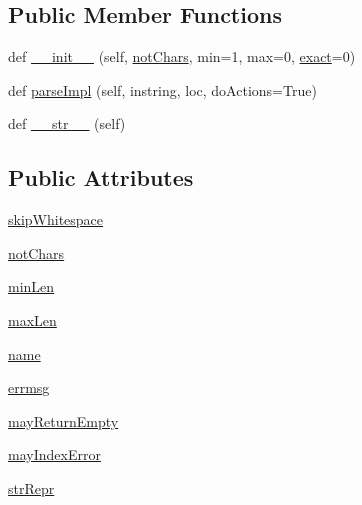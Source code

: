 \subsection*{Public Member Functions}
\begin{DoxyCompactItemize}
\item 
def \hyperlink{classsetuptools_1_1__vendor_1_1pyparsing_1_1CharsNotIn_a1aa8b49223feb8cc095a146acf54dfa8}{\+\_\+\+\_\+init\+\_\+\+\_\+} (self, \hyperlink{classsetuptools_1_1__vendor_1_1pyparsing_1_1CharsNotIn_aca873dd05f6e319faafa276d65469549}{not\+Chars}, min=1, max=0, \hyperlink{namespacesetuptools_1_1__vendor_1_1pyparsing_a4cac4dd1a3d815bb71fdb1334d94a010}{exact}=0)
\item 
def \hyperlink{classsetuptools_1_1__vendor_1_1pyparsing_1_1CharsNotIn_ab9d473644544bcc233f7a8646563d737}{parse\+Impl} (self, instring, loc, do\+Actions=True)
\item 
def \hyperlink{classsetuptools_1_1__vendor_1_1pyparsing_1_1CharsNotIn_a7ca88b3e542a6abcbed449f085b0c0a4}{\+\_\+\+\_\+str\+\_\+\+\_\+} (self)
\end{DoxyCompactItemize}
\subsection*{Public Attributes}
\begin{DoxyCompactItemize}
\item 
\hyperlink{classsetuptools_1_1__vendor_1_1pyparsing_1_1CharsNotIn_a5fc65c58bb0cf22d9c0844f52b4b7512}{skip\+Whitespace}
\item 
\hyperlink{classsetuptools_1_1__vendor_1_1pyparsing_1_1CharsNotIn_aca873dd05f6e319faafa276d65469549}{not\+Chars}
\item 
\hyperlink{classsetuptools_1_1__vendor_1_1pyparsing_1_1CharsNotIn_ab50d91a8e2c63f6d9f6832f5fdc24cfa}{min\+Len}
\item 
\hyperlink{classsetuptools_1_1__vendor_1_1pyparsing_1_1CharsNotIn_a976f580b5b147509add5d825964e7814}{max\+Len}
\item 
\hyperlink{classsetuptools_1_1__vendor_1_1pyparsing_1_1CharsNotIn_aa1323adca71d1f5a90902f8712bbb5eb}{name}
\item 
\hyperlink{classsetuptools_1_1__vendor_1_1pyparsing_1_1CharsNotIn_acf6b66d8c26032a1d6e2f472d0cdef59}{errmsg}
\item 
\hyperlink{classsetuptools_1_1__vendor_1_1pyparsing_1_1CharsNotIn_a8a972490d6e9177f3239d6fb7f8c3853}{may\+Return\+Empty}
\item 
\hyperlink{classsetuptools_1_1__vendor_1_1pyparsing_1_1CharsNotIn_a9264f966389adc0699e7c52532ca2845}{may\+Index\+Error}
\item 
\hyperlink{classsetuptools_1_1__vendor_1_1pyparsing_1_1CharsNotIn_a5f8e284d575f765e26b6629f3bc8dcde}{str\+Repr}
\end{DoxyCompactItemize}
